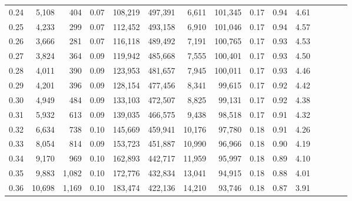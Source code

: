 \begin{tabular}{rrrcrrrrrrrrrrr}
0.24 &   5,108 &    404 &                                       0.07 &  108,219 &  497,391 &    6,611 &  101,345 &  0.17 &  0.94 &                         4.61 \\
0.25 &   4,233 &    299 &                                       0.07 &  112,452 &  493,158 &    6,910 &  101,046 &  0.17 &  0.94 &                         4.57 \\
0.26 &   3,666 &    281 &                                       0.07 &  116,118 &  489,492 &    7,191 &  100,765 &  0.17 &  0.93 &                         4.53 \\
0.27 &   3,824 &    364 &                                       0.09 &  119,942 &  485,668 &    7,555 &  100,401 &  0.17 &  0.93 &                         4.50 \\
0.28 &   4,011 &    390 &                                       0.09 &  123,953 &  481,657 &    7,945 &  100,011 &  0.17 &  0.93 &                         4.46 \\
0.29 &   4,201 &    396 &                                       0.09 &  128,154 &  477,456 &    8,341 &   99,615 &  0.17 &  0.92 &                         4.42 \\
0.30 &   4,949 &    484 &                                       0.09 &  133,103 &  472,507 &    8,825 &   99,131 &  0.17 &  0.92 &                         4.38 \\
0.31 &   5,932 &    613 &                                       0.09 &  139,035 &  466,575 &    9,438 &   98,518 &  0.17 &  0.91 &                         4.32 \\
0.32 &   6,634 &    738 &                                       0.10 &  145,669 &  459,941 &   10,176 &   97,780 &  0.18 &  0.91 &                         4.26 \\
0.33 &   8,054 &    814 &                                       0.09 &  153,723 &  451,887 &   10,990 &   96,966 &  0.18 &  0.90 &                         4.19 \\
0.34 &   9,170 &    969 &                                       0.10 &  162,893 &  442,717 &   11,959 &   95,997 &  0.18 &  0.89 &                         4.10 \\
0.35 &   9,883 &  1,082 &                                       0.10 &  172,776 &  432,834 &   13,041 &   94,915 &  0.18 &  0.88 &                         4.01 \\
0.36 &  10,698 &  1,169 &                                       0.10 &  183,474 &  422,136 &   14,210 &   93,746 &  0.18 &  0.87 &                         3.91 \\

\end{tabular}
